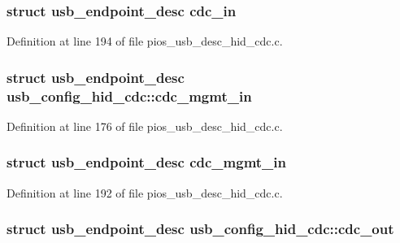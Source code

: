 \hypertarget{group___p_i_o_s___u_s_b___d_e_s_c_ga45cebf693381151be1d05f36c5ef2555}{
\subsubsection[{cdc\-\_\-in}]{\setlength{\rightskip}{0pt plus 5cm}struct {\bf usb\-\_\-endpoint\-\_\-desc} {\bf cdc\-\_\-in}}}\label{group___p_i_o_s___u_s_b___d_e_s_c_ga45cebf693381151be1d05f36c5ef2555}


\-Definition at line 194 of file pios\-\_\-usb\-\_\-desc\-\_\-hid\-\_\-cdc.\-c.

\hypertarget{group___p_i_o_s___u_s_b___d_e_s_c_gae83909d6ab80cf2e1ce3ecd22d1dc9ec}{
\subsubsection[{cdc\-\_\-mgmt\-\_\-in}]{\setlength{\rightskip}{0pt plus 5cm}struct {\bf usb\-\_\-endpoint\-\_\-desc} {\bf usb\-\_\-config\-\_\-hid\-\_\-cdc\-::cdc\-\_\-mgmt\-\_\-in}}}\label{group___p_i_o_s___u_s_b___d_e_s_c_gae83909d6ab80cf2e1ce3ecd22d1dc9ec}


\-Definition at line 176 of file pios\-\_\-usb\-\_\-desc\-\_\-hid\-\_\-cdc.\-c.

\hypertarget{group___p_i_o_s___u_s_b___d_e_s_c_ga712d76be7f3a64d87d05fabc10e2686e}{
\subsubsection[{cdc\-\_\-mgmt\-\_\-in}]{\setlength{\rightskip}{0pt plus 5cm}struct {\bf usb\-\_\-endpoint\-\_\-desc} {\bf cdc\-\_\-mgmt\-\_\-in}}}\label{group___p_i_o_s___u_s_b___d_e_s_c_ga712d76be7f3a64d87d05fabc10e2686e}


\-Definition at line 192 of file pios\-\_\-usb\-\_\-desc\-\_\-hid\-\_\-cdc.\-c.

\hypertarget{group___p_i_o_s___u_s_b___d_e_s_c_ga38856efc6dd6e0466e9bfb7533992dc3}{
\subsubsection[{cdc\-\_\-out}]{\setlength{\rightskip}{0pt plus 5cm}struct {\bf usb\-\_\-endpoint\-\_\-desc} {\bf usb\-\_\-config\-\_\-hid\-\_\-cdc\-::cdc\-\_\-out}}}\label{group___p_i_o_s___u_s_b___d_e_s_c_ga38856efc6dd6e0466e9bfb7533992dc3}


